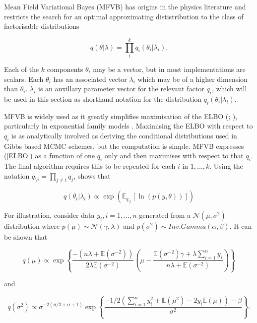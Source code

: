 \documentclass[12pt,a4paper]{article}%
\numberwithin{equation}{section}
\begin{document}
Mean Field Variational Bayes (MFVB) has origins in the physics literature \citep{Chandler1987} and restricts the search for an optimal approximating dististribution to the class of factorisable distributions

\begin{equation}
\label{mf1}
q(\theta|\lambda) = \prod_i^k q_i(\theta_i | \lambda_i).
\end{equation}

Each of the $k$ components $\theta_i$ may be a vector, but in most implementations are scalars. Each $\theta_i$ has an associated vector $\lambda_i$ which may be of a higher dimension than $\theta_i$. $\lambda_i$ is an auxillary parameter vector for the relevant factor $q_i$, which will be used in this section as shorthand notation for the distribution $q_i(\theta_i |\lambda_i)$. 

MFVB is widely used as it greatly simplifies maximisation of the ELBO (\citealp{Jordan1999}; \citealp{Bishop2006}), particularly in exponential family models \citep{Wainwright2008}.  Maximising the ELBO with respect to $q_i$ is as analytically involved as deriving the conditional distributions used in Gibbs based MCMC schemes, but the computation is simple. MFVB expresses (\ref{ELBO}) as a function of one $q_i$ only and then maximises with respect to that $q_i$. The final algorithm requires this to be repeated for each $i$ in $1, \dots, k$. Using the notation $q_{\setminus i} = \prod_{j\neq i}q_j$, \citet{Attias1999} shows that 

\begin{equation}
\label{mf2}
q(\theta_i | \lambda_i) \propto\exp( \mathbb{E}_{q_{\setminus i}} [\ln(p(y,\theta))])
\end{equation}

For illustration, consider data $y_i, i = 1, \dots, n$ generated from a $\mathcal{N}(\mu, \sigma^2)$ distribution where $p(\mu) \sim \mathcal{N}(\gamma, \lambda)$ and $p(\sigma^2) \sim Inv.Gamma(\alpha, \beta)$. It can be shown that

\begin{equation}
\label{mf3}
q(\mu) \propto \exp \left\{ \frac{-(n\lambda + \mathbb{E}(\sigma^{-2}))}{2\lambda\mathbb{E}(\sigma^{-2})} \left( \mu - \frac{\mathbb{E}(\sigma^{-2})\gamma + \lambda \sum_{i=1}^{n} y_i}{n \lambda + \mathbb{E}(\sigma^{-2})} \right) \right\}
\end{equation}

and

\begin{equation}
\label{mf4}
q(\sigma^2) \propto \sigma^{-2(n/2 + \alpha + 1)} \exp \left\{ \frac{ -1/2(\sum_{i=1}^{n}y_i^2 + \mathbb{E}(\mu^2) - 2 y_i \mathbb{E}(\mu)) - \beta}{\sigma^2} \right\}.
\end{equation}
\end{document}
